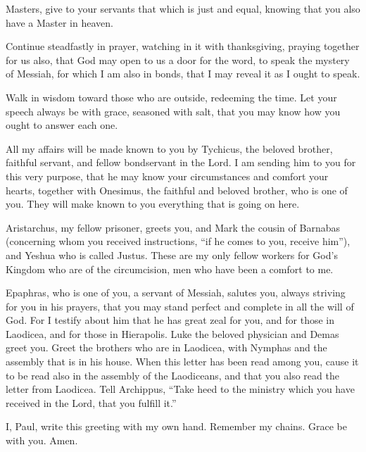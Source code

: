 \mychapter{} \myverse*{}Masters, give to your servants that which is just and equal, knowing
that you also have a Master in heaven.

\myverse{}Continue steadfastly in prayer, watching in it with thanksgiving,
\myverse{}praying together for us also, that God may open to us a door for the word, to
speak the mystery of Messiah, for which I am also in bonds,
\myverse{}that I may reveal it as I ought to speak.

\myverse{}Walk in wisdom toward those who are outside, redeeming the time.
\myverse{}Let your speech always be with grace, seasoned with salt, that you may know
how you ought to answer each one.

\myverse{}All my affairs will be made known to you by Tychicus, the beloved
brother, faithful servant, and fellow bondservant in the Lord.
\myverse{}I am sending him to you for this very purpose, that he may know your circumstances
and comfort your hearts,
\myverse{}together with Onesimus, the faithful and beloved brother, who is one of you.
They will make known to you everything that is going on here.

\myverse{}Aristarchus, my fellow prisoner, greets you, and Mark the cousin
of Barnabas (concerning whom you received instructions, “if he comes to you, receive him”),
\myverse{}and Yeshua who is called Justus. These are my only fellow workers for God’s
Kingdom who are of the circumcision, men who have been a comfort to me.

\myverse{}Epaphras, who is one of you, a servant of Messiah, salutes you,
always striving for you in his prayers, that you may stand perfect and complete in all the will of God.
\myverse{}For I testify about him that he has great zeal for you, and for those in Laodicea,
and for those in Hierapolis.
\myverse{}Luke the beloved physician and Demas greet you.
\myverse{}Greet the brothers who are in Laodicea, with Nymphas and the assembly that
is in his house.
\myverse{}When this letter has been read among you, cause it to be read also in the
assembly of the Laodiceans, and that you also read the letter from Laodicea.
\myverse{}Tell Archippus, “Take heed to the ministry which you have received in the
Lord, that you fulfill it.”

\myverse{}I, Paul, write this greeting with my own hand. Remember my chains.
Grace be with you. Amen.


